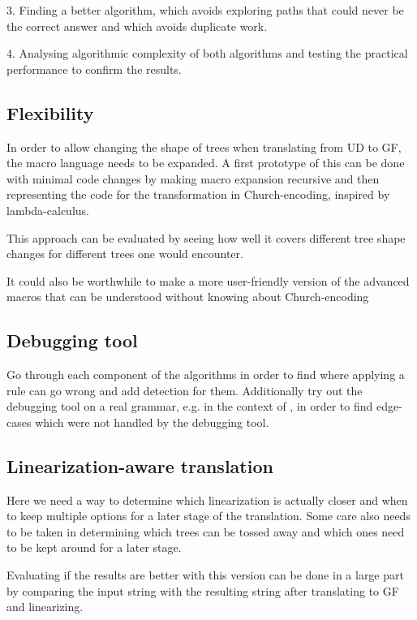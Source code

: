 \documentclass{article}
\begin{document}
3. Finding a better algorithm, which avoids exploring paths that could never be the correct answer and which avoids duplicate work.

4. Analysing algorithmic complexity of both algorithms and testing the practical performance to confirm the results.

\subsection{Flexibility}

In order to allow changing the shape of trees when translating from UD to GF, the macro language needs to be expanded.
A first prototype of this
can be done with minimal code changes by making macro expansion recursive and then representing the code for the transformation in Church-encoding, inspired by lambda-calculus.

This approach can be evaluated by seeing how well it covers different tree shape changes for different trees one would encounter.

It could also be worthwhile to make a more user-friendly version of the advanced macros that can be understood without knowing about Church-encoding

\subsection{Debugging tool}
Go through each component of the algorithms in order to find where applying a rule can go wrong and add detection for them. Additionally try out the debugging tool on a real grammar, e.g. in the context of \cite{listenmaa-etal-2021-towards}, in order to find edge-cases which were not handled by the debugging tool.


\subsection{Linearization-aware translation}
Here we need a way to determine which linearization is actually closer and when to keep multiple options for a later stage of the translation. Some care also needs to be taken in determining which trees can be tossed away and which ones need to be kept around for a later stage.

Evaluating if the results are better with this version can be done in a large part by comparing the input string with the resulting string after translating to GF and linearizing.
\end{document}
